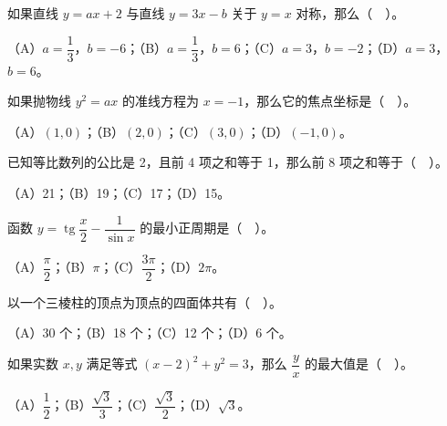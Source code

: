 \begin{question}
如果直线 $y=ax+2$ 与直线 $y=3x-b$ 关于 $y=x$ 对称，那么（　）。

（A）$a=\dfrac13$，$b=-6$；（B）$a=\dfrac13$，$b=6$；（C）$a=3$，$b=-2$；（D）$a=3$，$b=6$。

\end{question}
\begin{question}
如果抛物线 $y^2=ax$ 的准线方程为 $x=-1$，那么它的焦点坐标是（　）。

（A）$(1,0)$；（B）$(2,0)$；（C）$(3,0)$；（D）$(-1,0)$。

\end{question}
\begin{question}
已知等比数列的公比是 2，且前 4 项之和等于 1，那么前 8 项之和等于（　）。

（A）21；（B）19；（C）17；（D）15。

\end{question}
\begin{question}
函数 $y=\operatorname{tg}\dfrac{x}{2}-\dfrac{1}{\sin x}$ 的最小正周期是（　）。

（A）$\dfrac{\pi}{2}$；（B）$\pi$；（C）$\dfrac{3\pi}{2}$；（D）$2\pi$。

\end{question}
\begin{question}
以一个三棱柱的顶点为顶点的四面体共有（　）。

（A）30 个；（B）18 个；（C）12 个；（D）6 个。

\end{question}
\begin{question}
如果实数 $x,y$ 满足等式 $(x-2)^2+y^2=3$，那么 $\dfrac{y}{x}$ 的最大值是（　）。

（A）$\dfrac12$；（B）$\dfrac{\sqrt3}{3}$；（C）$\dfrac{\sqrt3}{2}$；（D）$\sqrt3$。

\end{question}

